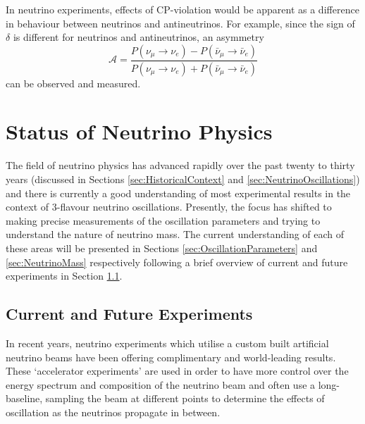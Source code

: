 In neutrino experiments, effects of CP-violation would be apparent as a difference in behaviour between neutrinos and antineutrinos.  For example, since the sign of $\delta$ is different for neutrinos and antineutrinos, an asymmetry
\begin{equation}
  \mathcal{A} = \frac{P(\nu_{\mu}\rightarrow\nu_e)-P(\bar{\nu}_{\mu}\rightarrow\bar{\nu}_e)}{P(\nu_{\mu}\rightarrow\nu_e)+P(\bar{\nu}_{\mu}\rightarrow\bar{\nu}_e)}
\end{equation}
can be observed and measured.

\section{Status of Neutrino Physics}\label{sec:NeutrinoPhysicsStatus}

The field of neutrino physics has advanced rapidly over the past twenty to thirty years (discussed in Sections \ref{sec:HistoricalContext} and \ref{sec:NeutrinoOscillations}) and there is currently a good understanding of most experimental results in the context of 3-flavour neutrino oscillations.  Presently, the focus has shifted to making precise measurements of the oscillation parameters and trying to understand the nature of neutrino mass.  The current understanding of each of these areas will be presented in Sections \ref{sec:OscillationParameters} and \ref{sec:NeutrinoMass} respectively following a brief overview of current and future experiments in Section \ref{sec:CurrentExperiments}.

\subsection{Current and Future Experiments}\label{sec:CurrentExperiments}

In recent years, neutrino experiments which utilise a custom built artificial neutrino beams have been offering complimentary and world-leading results.  These `accelerator experiments' are used in order to have more control over the energy spectrum and composition of the neutrino beam and often use a long-baseline, sampling the beam at different points to determine the effects of oscillation as the neutrinos propagate in between.

